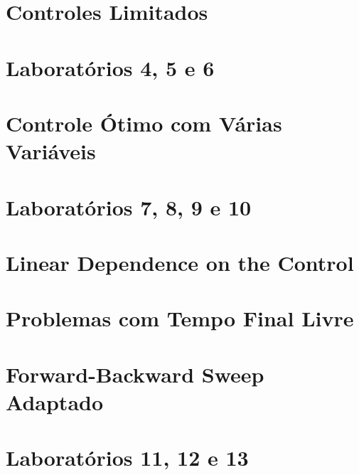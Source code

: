 \documentclass[a4paper, 11pt, oneside]{book}
\theoremstyle{definition}
\begin{document}
\chapter{Controles Limitados}
\label{ch:8}


\chapter{Laboratórios 4, 5 e 6}
\label{labs456}


\chapter{Controle Ótimo com Várias Variáveis}
\label{ch:12}


\chapter{Laboratórios 7, 8, 9 e 10}
\label{labs78910}


\chapter{Linear Dependence on the Control}
\label{ch:17}


\chapter{Problemas com Tempo Final Livre}
\label{ch:20}


\chapter{Forward-Backward Sweep Adaptado}
\label{ch:21}


\chapter{Laboratórios 11, 12 e 13}
\label{labs111213}



\end{document}
